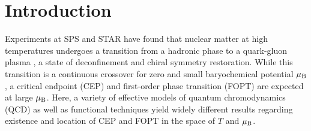 \documentclass[%
 reprint,
 amsmath,amssymb,
 aps,
]{revtex4-2}
\begin{document}
\maketitle


\section{Introduction}
\label{sec:introduction}

Experiments at SPS and STAR have found that nuclear matter at high temperatures undergoes a transition from a hadronic phase to a quark-gluon plasma \cite{Heinz:2000bk,STAR:2005gfr}, a state of deconfinement and chiral symmetry restoration. While this transition is a continuous crossover for zero and small baryochemical potential $\mu_{\rm B}$ \cite{Aoki:2006we,Borsanyi:2010bp,Bazavov:2014pvz}, a critical endpoint (CEP) and first-order phase transition (FOPT) are expected at large $\mu_{\rm B}$. Here, a variety of effective models of quantum chromodynamics (QCD) \cite{Scavenius:2000qd,Schaefer:2004en,Fukushima:2008wg} as well as functional techniques \cite{Fischer:2014ata,Gao:2020fbl} yield widely different results regarding existence and location of CEP and FOPT in the space of $T$ and $\mu_{\rm B}$. 
\end{document}
